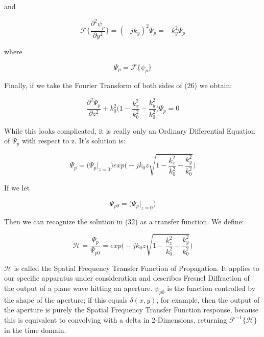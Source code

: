 \documentclass{article}
\begin{document}
and

\begin{equation}
	\mathscr{F} \Big\{ \frac{\partial^2 \psi_{p}}{\partial y^2} \Big\} = (-jk_{y})^2\Psi_{p} = -k_{y}^2\Psi_{p}
\end{equation}

where 

\begin{equation}
	\Psi_{p} = \mathscr{F} \{\psi_{p}\}
\end{equation}

Finally, if we take the Fourier Transform of both sides of (26) we obtain:

\begin{equation}
	\frac{\partial^2\Psi_{p}}{\partial z^2} + k_{0}^{2} \bigg ( 1 - \frac{k_{x}^2}{k_{0}^2} - \frac{k_{y}^2}{k_{0}^2} \bigg ) \Psi_{p} = 0
\end{equation}

While this looks complicated, it is really only an Ordinary Differential Equation of \(\Psi_{p}\) with respect to z. It's solution is:

\begin{equation}
	\Psi_{p} = \big(\Psi_{p}\vert_{z = 0}\big) exp\bigg(-jk_{0}z\sqrt{1 - \frac{k_{x}^2}{k_{0}^2} - \frac{k_{y}^2}{k_{0}^2}}\bigg)
\end{equation}

If we let

\begin{equation}
	\Psi_{p0} = \big(\Psi_{p}\vert_{z = 0}\big)
\end{equation}

Then we can recognize the solution in (32) as a transfer function. We define:

\begin{equation}
	\mathscr{H} = \frac{\Psi_{p}}{\Psi_{p0}} = exp\bigg(-jk_{0}z\sqrt{1 - \frac{k_{x}^2}{k_{0}^2} - \frac{k_{y}^2}{k_{0}^2}}\bigg)
\end{equation}

\(\mathscr{H}\) is called the Spatial Frequency Transfer Function of Propagation. It applies to our specific apparatus under consideration and describes Fresnel Diffraction of the output of a plane wave hitting an aperture. \(\psi_{p0}\) is the function controlled by the shape of the aperture; if this equals \(\delta(x,y)\), for example, then the output of the aperture is purely the Spatial Frequency Transfer Function response, because this is equivalent to convolving with a delta in 2-Dimensions, returning \(\mathscr{F}^{-1} \{\mathscr{H}\} \) in the time domain.
\end{document}
